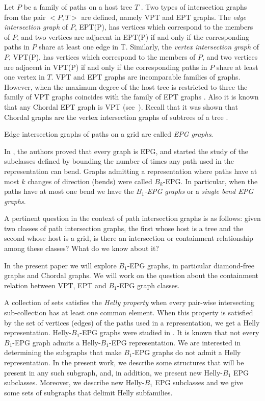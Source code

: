 \documentclass[9pt]{entcs}
\begin{document}
 Let $P$ be a family of paths on a host tree $T$ . Two types of intersection graphs from the pair $<P,T>$ are defined, namely VPT and EPT graphs.
The \textit{edge intersection graph} of $P$, EPT(P), has vertices which correspond to the members of $P$, and two vertices are adjacent in EPT(P) if and only if the corresponding paths in $P$ share at least one edge in T. Similarly, the \textit{vertex intersection graph} of $P$, VPT(P), has vertices which correspond to the members of $P$, and two vertices are adjacent in VPT(P) if and only if the corresponding paths in $P$ share at least one vertex in $T$.
%
VPT and EPT graphs are incomparable families of graphs. However, when the maximum degree of the host tree is restricted to three the family of
VPT graphs coincides with the family of EPT graphs \cite{golumbic1985edge%
}. Also it is known that any Chordal EPT graph is VPT (see~\cite{syslo1985triangulated}). Recall that it was shown that Chordal graphs are the vertex intersection graphs of subtrees of a tree \cite{gavril1974intersection}.


Edge intersection graphs of paths on a grid are called \textit{EPG graphs}. 

In \cite{golumbic2009}, the authors proved that every graph is EPG, and started the study of the subclasses
defined by bounding the number of times any path used in the representation can bend.  Graphs admitting a representation
where  paths  have at most $k$ changes of direction  (bends) were called $B_k$-EPG. 
 In particular, when the paths have at most one bend we have the \textit{ $B_1$-EPG graphs} or a \textit{single bend EPG graphs}.

 A pertinent question in the context of path intersection graphs is as follows: given two classes of path intersection graphs,
 the first whose host is a tree and the second whose host is a grid,  is there an intersection or containment relationship among these classes? What do we know about it?

In the present paper we will explore $B_1$-EPG graphs, in particular diamond-free graphs and Chordal graphs. We will work on the question about the containment
relation between  VPT, EPT and $B_1$-EPG graph classes.


 A collection  of sets satisfies the \textit{Helly property} when every pair-wise intersecting sub-collection  has at least one common element. When this property
 is satisfied by the set of vertices (edges) of the paths used in a representation, we get a Helly representation.  Helly-$B_1$-EPG graphs were studied
 in \cite{bornstein2019complexity}.                                     
It is known that not every $B_1$-EPG graph admits a Helly-$B_1$-EPG representation. We are interested in determining the subgraphs that make
$B_1$-EPG graphs do not admit a Helly representation. In the present work, we describe some structures that will be present in any such subgraph,
and, in addition, we present new  Helly-$B_1$ EPG  subclasses.
Moreover,  we  describe new  Helly-$B_1$ EPG  subclasses %
and we give some sets of subgraphs that delimit Helly subfamilies.   
\end{document}
